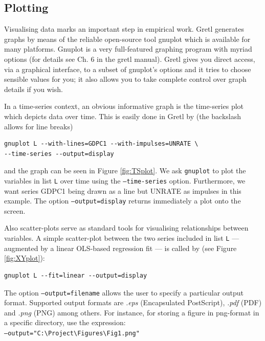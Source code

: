 \documentclass[11pt]{article}
\begin{document}
\subsection{Plotting}
Visualising data marks an important step in empirical work. Gretl generates graphs by means of the reliable open-source tool gnuplot which is available for many platforms. Gnuplot is a very full-featured graphing program with myriad options (for details see Ch. 6 in the gretl manual). Gretl gives you direct access, via a graphical interface, to a subset of gnuplot’s options and it tries to choose sensible values for you; it also allows you to take complete control over graph details if you wish.

In a time-series context, an obvious informative graph is the time-series plot which depicts data over time. This is easily done in Gretl by (the backslash allows for line breaks)
\begin{Verbatim}[baselinestretch=0.75, fontsize=\small]
gnuplot L --with-lines=GDPC1 --with-impulses=UNRATE \
--time-series --output=display
\end{Verbatim}
and the graph can be seen in Figure \ref{fig:TSplot}. We ask \texttt{gnuplot} to plot the variables in list \texttt{L} over time using the \texttt{---time-series} option. Furthermore, we want series GDPC1 being drawn as a line but UNRATE as impulses in this example. The option \texttt{---output=display} returns immediately a plot onto the screen.

Also scatter-plots serve as standard tools for visualising relationships between variables. A simple scatter-plot between the two series included in list \texttt{L} --- augmented by a linear OLS-based regression fit --- is called by (see Figure \ref{fig:XYplot}):
\begin{Verbatim}[baselinestretch=0.75, fontsize=\small]
gnuplot L --fit=linear --output=display
\end{Verbatim}
The option \texttt{---output=filename} allows the user to specify a particular output format. Supported output formats are \textit{.eps} (Encapsulated PostScript), \textit{.pdf} (PDF) and \textit{.png} (PNG) among others. For instance, for storing a figure in png-format in a specific directory, use the expression: \\
\texttt{---output="C:\textbackslash{Project}\textbackslash{Figures}\textbackslash{Fig1}.png"}
\end{document}
